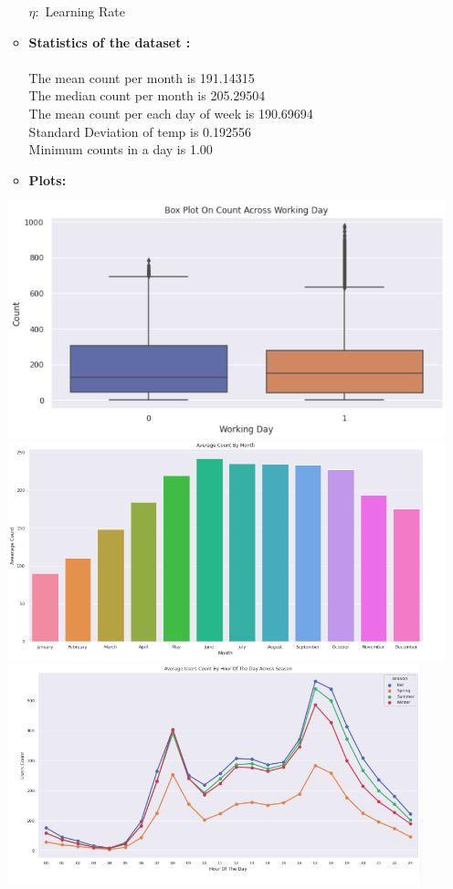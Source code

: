 \documentclass[english,a4paper,12pt]{article}
\begin{document}
\begin{enumerate}
\begin{itemize}
$\eta:$ Learning Rate
\item \textbf{Statistics of the dataset :} \\\\
   The mean count per month is 191.14315 \\
The median count per month is 205.29504\\
The mean count per each day of week is 190.69694\\
Standard Deviation of temp is 0.192556\\
Minimum counts in a day is 1.00\\
\newpage
\item \textbf{Plots:}
   \end{itemize} 

   
\includegraphics[width=15cm]{pictures/Plot_Q4_1.png} \\ 
\includegraphics[width=15cm]{pictures/Plot_Q4_2.png} \\ 
\newpage
\includegraphics[width=12cm]{pictures/Plot_Q4_3.png} \\ 

\end{enumerate}
\end{document}

